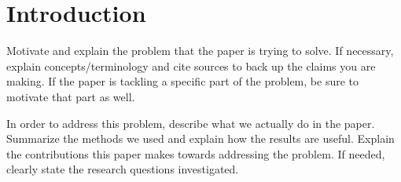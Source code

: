 \section{Introduction}\label{sec:intro}


Motivate and explain the problem that the paper is trying to solve. If
necessary, explain concepts/terminology and cite sources to back up the claims
you are making. If the paper is tackling a specific part of the problem, be sure
to motivate that part as well.

In order to address this problem, describe what we actually do in the paper.
Summarize the methods we used and explain how the results are useful. Explain
the contributions this paper makes towards addressing the problem. If needed,
clearly state the research questions investigated.
